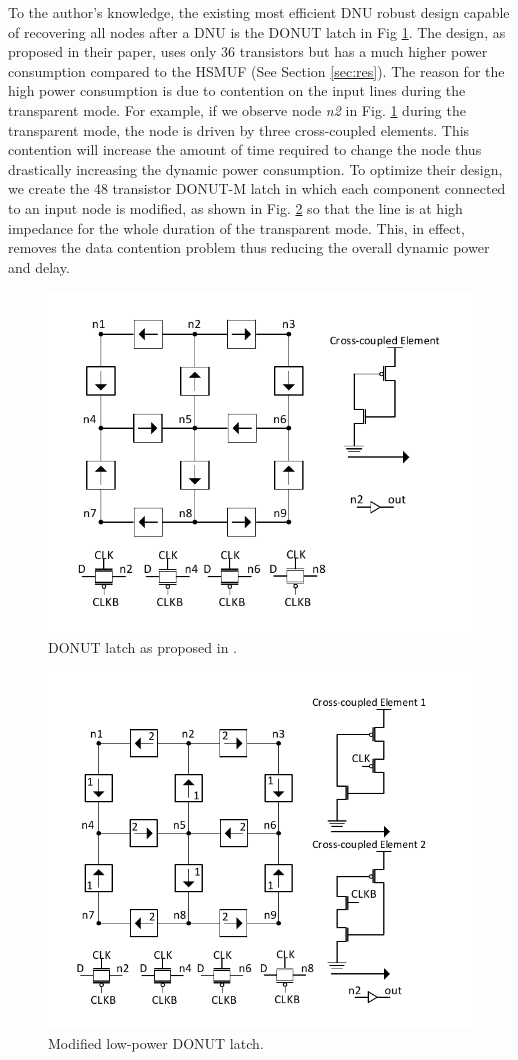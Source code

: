 To the author's knowledge, the existing most efficient DNU robust design capable of recovering all nodes after a DNU is the DONUT latch \cite{DONUT} in Fig \ref{fig:DONUT}. The design, as proposed in their paper, uses only 36 transistors but has a much higher power consumption compared to the HSMUF (See Section \ref{sec:res}). The reason for the high power consumption is due to contention on the input lines during the transparent mode. For example, if we observe node \textit{n2} in Fig. \ref{fig:DONUT} during the transparent mode, the node is driven by three cross-coupled elements. This contention will increase the amount of time required to change the node thus drastically increasing the dynamic power consumption. To optimize their design, we create the 48 transistor DONUT-M latch in which each component connected to an input node is modified, as shown in Fig. \ref{DONUT_M} so that the line is at high impedance for the whole duration of the transparent mode. This, in effect, removes the data contention problem thus reducing the overall dynamic power and delay.  

\begin{figure}[!htbp]
	\centering
	\includegraphics[width=0.65\linewidth]{Figures/DONUT}
	\caption{DONUT latch as proposed in \cite{DONUT}.}
	\label{fig:DONUT}
\end{figure}

\begin{figure}[!htbp]
	\centering
	\includegraphics[width=0.65\linewidth]{Figures/ModDONUT}
	\caption{Modified low-power DONUT latch.}
	\label{DONUT_M}
\end{figure}

